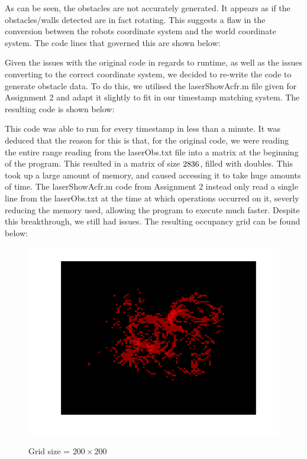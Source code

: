 {		As can be seen, the obstacles are not accurately generated. It appears as if the obstacles/walls detected are in fact rotating. This suggests a flaw in the conversion between the robots coordinate system and the world coordinate system. The code lines that governed this are shown below:
				
		\pagebreak
		\newline
		Given the issues with the original code in regards to runtime, as well as the issues converting to the correct coordinate system, we decided to re-write the code to generate obstacle data. To do this, we utilised the laserShowAcfr.m file given for Assignment 2 and adapt it slightly to fit in our timestamp matching system. The resulting code is shown below:
		
		\pagebreak
		\newline
		This code was able to run for every timestamp in less than a minute. It was deduced that the reason for this is that, for the original code, we were reading the entire range reading from the laserObs.txt file into a matrix at the beginning of the program. This resulted in a matrix of size ${2836 \time 362}$, filled with doubles. This took up a large amount of memory, and caused accessing it to take huge amounts of time. The laserShowAcfr.m code from Assignment 2 instead only read a single line from the laserObs.txt at the time at which operations occurred on it, severly reducing the memory used, allowing the program to execute much faster.\newline
		Despite this breakthrough, we still had issues. The resulting occupancy grid can be found below:
		\begin{figure}[position = here]
			\begin{centering}
				\includegraphics[scale=1]{./images/q2/heatmap_attempt2.png}\\
				\caption{Grid size = ${200 \times 200}$}
			\end{centering}
		\end{figure}
		\newline
		
}
